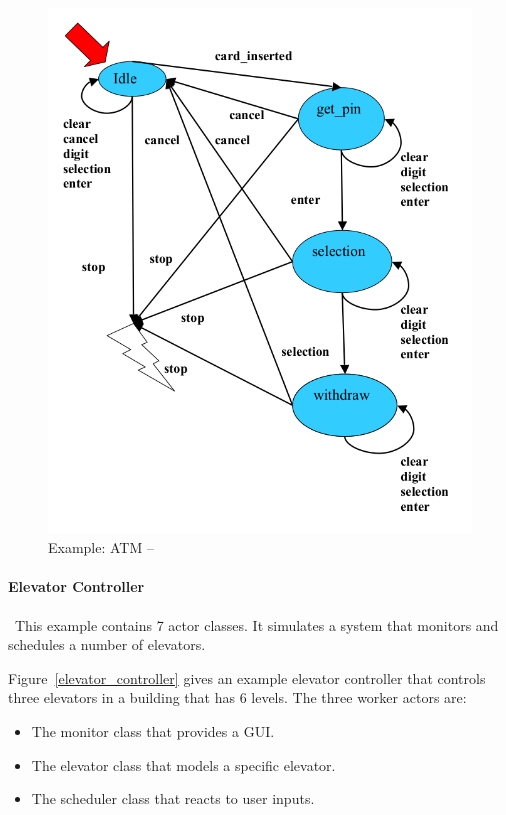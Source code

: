 \begin{figure}[p]
     \begin{center}            
\includegraphics[keepaspectratio=true,height=0.6\paperheight]
{Pictures/ATM_FSM.png}
    \end{center}
     \caption{Example: ATM -- \citep{quviq}}
   \label{atm}
\end{figure}


\paragraph{Elevator Controller}\ This example contains 7 actor classes.  It 
simulates a system that monitors and schedules a number of elevators.

Figure~\ref{elevator_controller} gives an example elevator controller that 
controls three elevators in a building that has 6 levels.  The three worker 
actors are:
\begin{itemize}
 \item The monitor class that provides a GUI.
 \item The elevator class that models a specific elevator.
 \item The scheduler class that reacts to user inputs.
\end{itemize}

